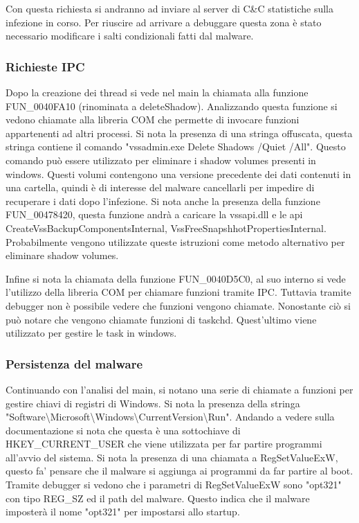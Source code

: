 \documentclass[a4paper,12pt]{article}
\begin{document}
Con questa richiesta si andranno ad inviare al server di C\&C statistiche sulla infezione in corso. Per riuscire ad arrivare a debuggare questa zona è stato necessario modificare i salti condizionali fatti dal malware.

\subsubsection{Richieste IPC}
Dopo la creazione dei thread si vede nel main la chiamata alla funzione FUN\_0040FA10 (rinominata a deleteShadow). Analizzando questa funzione si vedono chiamate alla libreria COM che permette di invocare funzioni appartenenti ad altri processi.  Si nota la presenza di una stringa offuscata, questa stringa contiene il comando "vssadmin.exe Delete Shadows /Quiet /All". Questo comando può essere utilizzato per eliminare i shadow volumes presenti in windows. Questi volumi contengono una versione precedente dei dati contenuti in una cartella, quindi è di interesse del malware cancellarli per impedire di recuperare i dati dopo l'infezione. Si nota anche la presenza della funzione FUN\_00478420, questa funzione andrà a caricare la vssapi.dll e le api CreateVssBackupComponentsInternal, VssFreeSnapshhotPropertiesInternal. Probabilmente vengono utilizzate queste istruzioni come metodo alternativo per eliminare shadow volumes. 

Infine si nota la chiamata della funzione FUN\_0040D5C0, al suo interno si vede l'utilizzo della libreria COM per chiamare funzioni tramite IPC. Tuttavia tramite debugger non è possibile vedere che funzioni vengono chiamate. Nonostante ciò si può notare che vengono chiamate funzioni di taskchd. Quest'ultimo viene utilizzato per gestire le task in windows. 
  
\subsubsection{Persistenza del malware}
Continuando con l'analisi del main, si notano una serie di chiamate a funzioni per gestire chiavi di registri di Windows. Si nota la presenza della stringa "Software\textbackslash Microsoft\textbackslash Windows\textbackslash CurrentVersion\textbackslash Run". Andando a vedere sulla documentazione si nota che questa è una sottochiave di HKEY\_CURRENT\_USER che viene utilizzata per far partire programmi all'avvio del sistema. Si nota la presenza di una chiamata a RegSetValueExW, questo fa' pensare che il malware si aggiunga ai programmi da far partire al boot. Tramite debugger si vedono che i parametri di RegSetValueExW sono "opt321" con tipo REG\_SZ ed il path del malware. Questo indica che il malware imposterà il nome "opt321" per impostarsi allo startup.
\end{document}
